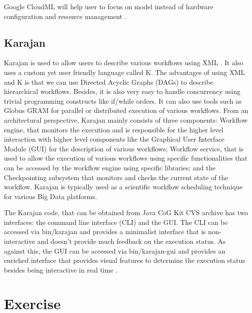      Google CloudML will help user to focus on model instead of hardware
     configuration and resource management \cite{www-googlecloudoverview}.

\subsection{Karajan}

     Karajan is used to allow users to describe various workflows
     using XML \cite{RMBDP-Book-1}.  It also uses a custom yet user
     friendly language called K.  The advantages of using XML and K is
     that we can use Directed Acyclic Graphs (DAGs) to describe
     hierarchical workflows.  Besides, it is also very easy to handle
     concurrency using trivial programming constructs like if/while
     orders.  It can also use tools such as Globus GRAM for parallel
     or distributed execution of various workflows.  From an
     architectural perspective, Karajan mainly consists of three
     components: Workflow engine, that monitors the execution and is
     responsible for the higher level interaction with higher level
     components like the Graphical User Interface Module (GUI) for the
     description of various workflows; Workflow service, that is used
     to allow the execution of various workflows using specific
     functionalities that can be accessed by the workflow engine using
     specific libraries; and the Checkpointing subsystem that monitors
     and checks the current state of the workflow.  Karajan is
     typically used as a scientific workflow scheduling technique for
     various Big Data platforms.

     The Karajan code, that can be obtained from Java CoG Kit CVS
     archive has two interfaces: the command line interface (CLI) and
     the GUI.  The CLI can be accessed via bin/karajan and provides a
     minimalist interface that is non-interactive and doesn't provide
     much feedback on the execution status.  As against this, the GUI
     can be accessed via bin/karajan-gui and provides an enriched
     interface that provides visual features to determine the
     execution status besides being interactive in real time
     \cite{Karajan-interfaces}.


\section{Exercise}

